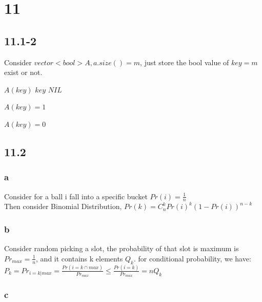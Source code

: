 \documentclass[]{article}
\begin{document}
\section{11}

\subsection{11.1-2}
Consider $vector<bool> A, a.size() = m$, just store the bool value of $key = m$ exist or not.

\begin{codebox}
	\li \If $A(key)$
	\li		\Then \Return $key$
	\li  \Else \Return $NIL$
	\End
\end{codebox}

\begin{codebox}
	\li $A(key) = 1$
\end{codebox}

\begin{codebox}
	\li $A(key) = 0$
\end{codebox}

\subsection{11.2}
\subsubsection{a}

Consider for a ball i fall into a specific bucket $Pr(i) = \frac{1}{n}$\\
Then consider Binomial Distribution, $Pr(k) = C_{n}^{k}Pr(i)^{k}(1-Pr(i))^{n-k}$

\subsubsection{b}

Consider random picking a slot, the probability of that slot is maximum is $Pr_{max} = \frac{1}{n}$, and it contains k elements $Q_{k}$. for conditional probability, we have:\\
$P_{k} = Pr_{i=k|max} = \frac{Pr(i=k \cap max)}{Pr_{max}} \le \frac{Pr(i=k)}{Pr_{max}} = nQ_{k}$

\subsubsection{c}
\end{document}
